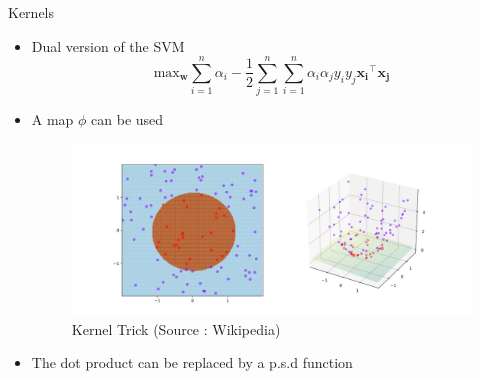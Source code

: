 \documentclass[compress]{beamer}
\let\vec\mathbf
\begin{document}
\begin{frame}{Kernels}
	\begin{itemize}
		\item Dual version of the SVM
		\begin{equation*}
		\text{max}_{\vec{w}} \sum\limits_{i=1}^{n} \alpha_i - \frac{1}{2} \sum\limits_{j=1}^{n}\sum\limits_{i=1}^{n}\alpha_{i}\alpha_{j}y_{i}y_{j}\vec{x_{i}}^{\top}\vec{x_{j}}
		\end{equation*}
		\item A map $\phi$ can be used
		\begin{figure}
			\includegraphics[width=0.7\linewidth]{data/kernel.png}
			\caption{Kernel Trick (Source : Wikipedia)}
		\end{figure}
		\item The dot product can be replaced by a p.s.d function
	\end{itemize}
\end{frame}
\end{document}
